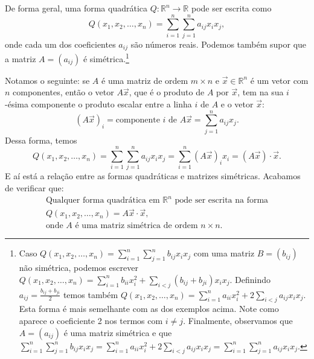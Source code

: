 De forma geral, uma forma quadrática $Q :\mathbb{R}^n \to \mathbb{R}$ pode ser escrita como
\begin{equation}\label{geral}
Q(x_1, x_2, \dots, x_n) = \sum_{i=1}^{n} \sum_{j=1}^{n} a_{ij} x_i x_j,
\end{equation} onde cada um dos coeficientes $a_{ij}$ são números reais. Podemos também supor que a matriz $A = (a_{ij})$ é simétrica.\footnote{Caso  $Q(x_1, x_2, \dots, x_n) = \sum_{i=1}^{n} \sum_{j=1}^{n} b_{ij} x_i x_j$ com uma matriz $B = (b_{ij})$  não  simétrica, podemos escrever $Q(x_1, x_2, \dots, x_n) = \sum_{i=1}^{n} b_{ii} x_i^2 + \sum_{i < j} (b_{ij} + b_{ji}) x_i x_j$. Definindo $a_{ij} = \frac{b_{ij} + b_{ji}}{2}$ temos também $Q(x_1, x_2, \dots, x_n) = \sum_{i=1}^{n} a_{ii} x_i^2 + 2 \sum_{i < j} a_{ij} x_i x_j$. Esta forma é mais semelhante com as dos exemplos acima. Note como aparece o coeficiente 2 nos termos com $i \neq j$. Finalmente, observamos que $A = (a_{ij})$ é uma matriz simétrica e que $\sum_{i=1}^{n} \sum_{j=1}^{n} b_{ij} x_i x_j = \sum_{i=1}^{n} a_{ii} x_i^2 + 2 \sum_{i < j} a_{ij} x_i x_j = \sum_{i=1}^{n} \sum_{j=1}^{n} a_{ij} x_i x_j.$}


Notamos o seguinte: se $A$ é uma matriz de ordem $m \times n$ e $\vec{x} \in \mathbb{R}^n$ é um vetor com $n$ componentes, então o vetor $A \vec{x}$, que é o produto de $A$ por $\vec{x}$, tem na sua $i$-ésima componente o produto escalar entre a linha $i$ de $A$ e o vetor $\vec{x}$:
\begin{equation}
\left( A \vec{x} \right)_i = \text{componente $i$ de } A \vec{x} = \sum_{j=1}^{n} a_{ij} x_j.
\end{equation} Dessa forma, temos
\begin{equation}
Q(x_1, x_2, \dots, x_n) = \sum_{i=1}^{n} \sum_{j=1}^{n} a_{ij} x_i x_j = \sum_{i=1}^{n} \left( A \vec{x} \right)_i x_i  =  \left( A \vec{x} \right) \cdot \vec{x}.
\end{equation} E aí está a relação entre as formas quadráticas e matrizes simétricas. Acabamos de verificar que:
\begin{equation}
\boxed{\begin{array}{c}
	\text{Qualquer forma quadrática em $\mathbb{R}^n$ pode ser escrita na forma} \\
	Q(x_1, x_2, \dots, x_n) = A \vec{x}  \cdot \vec{x}, \\
	\text{onde $A$ é uma matriz simétrica de ordem $n\times n$.}
	\end{array}}
\end{equation}

